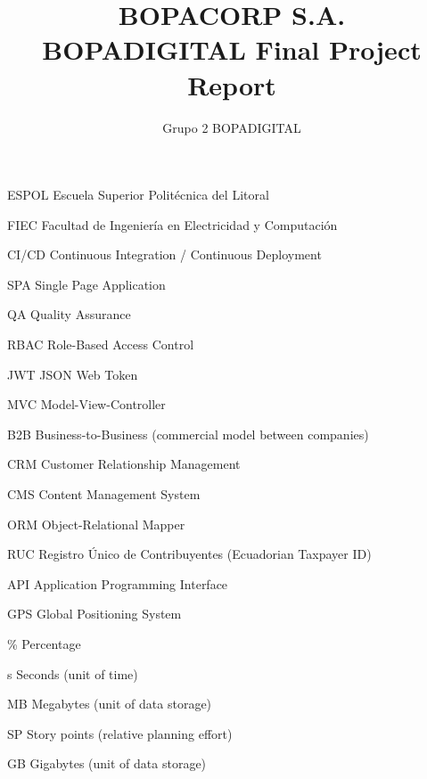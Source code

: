 \documentclass[letterpaper%
, oneside%
, 12pt%
, memoireprojet%
, english%
,creativecommons,hyperref, withAlgo2e %
]{thETS}
\title{BOPACORP S.A.\\
BOPADIGITAL Final Project Report}
\author{Grupo 2 BOPADIGITAL}
\begin{document}

\maketitle

\presentjury

\tableofcontents

\listoftables

\listoffigures

\begin{listofabbr}[3cm]
\item [ESPOL] Escuela Superior Politécnica del Litoral
\item [FIEC] Facultad de Ingeniería en Electricidad y Computación
\item [CI/CD] Continuous Integration / Continuous Deployment
\item [SPA] Single Page Application
\item [QA] Quality Assurance
\item [RBAC] Role-Based Access Control
\item [JWT] JSON Web Token
\item [MVC] Model-View-Controller
\item [B2B] Business-to-Business (commercial model between companies)
\item [CRM] Customer Relationship Management
\item [CMS] Content Management System
\item [ORM] Object-Relational Mapper
\item [RUC] Registro Único de Contribuyentes (Ecuadorian Taxpayer ID)
\item [API] Application Programming Interface
\item [GPS] Global Positioning System
\end{listofabbr}

\begin{listofsymbols}[3cm]
\item [\%] Percentage
\item [s] Seconds (unit of time)
\item [MB] Megabytes (unit of data storage)
\item [SP] Story points (relative planning effort)
\item [GB] Gigabytes (unit of data storage)
\end{listofsymbols}
\end{document}
